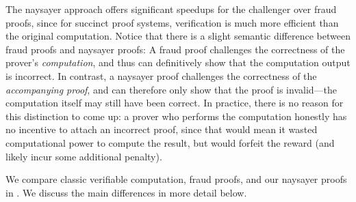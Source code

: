 
The naysayer approach offers significant speedups for the challenger over fraud proofs, since for succinct proof systems, verification is much more efficient than the original computation. 
Notice that there is a slight semantic difference between fraud proofs and naysayer proofs: A fraud proof challenges the correctness of the prover's \emph{computation}, and thus can definitively show that the computation output is incorrect. In contrast, a naysayer proof challenges the correctness of the \emph{accompanying proof}, and can therefore only show that the proof is invalid---the computation itself may still have been correct. In practice, there is no reason for this distinction to come up: a prover who performs the computation honestly has no incentive to attach an incorrect proof, since that would mean it wasted computational power to compute the result, but would forfeit the reward (and likely incur some additional penalty).





We compare classic verifiable computation, fraud proofs, and our naysayer proofs in . We discuss the main differences in more detail below.

